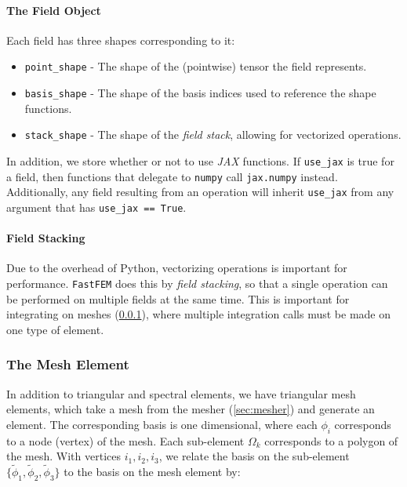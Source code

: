 \paragraph{The Field Object}

Each field has three shapes corresponding to it:
\begin{itemize}
\item \verb+point_shape+ - The shape of the (pointwise) tensor the field represents.
\item \verb+basis_shape+ - The shape of the basis indices used to reference the shape functions.
\item \verb+stack_shape+ - The shape of the \emph{field stack}, allowing for vectorized operations.
\end{itemize}

In addition, we store whether or not to use \emph{JAX} functions. If \verb+use_jax+ is true for a field, then functions that delegate to \verb+numpy+ call \verb+jax.numpy+ instead. Additionally, any field resulting from an operation will inherit \verb+use_jax+ from any argument that has \verb+use_jax == True+.

\paragraph{Field Stacking}

Due to the overhead of Python, vectorizing operations is important for performance. \texttt{FastFEM} does this by \emph{field stacking}, so that a single operation can be performed on multiple fields at the same time. This is important for integrating on meshes (\ref{sec:elem_field:mesh_element}), where multiple integration calls must be made on one type of element.

\subsubsection{The Mesh Element} \label{sec:elem_field:mesh_element}

In addition to triangular and spectral elements, we have triangular mesh elements, which take a mesh from the mesher (\ref{sec:mesher}) and generate an element. The corresponding basis is one dimensional, where each $\phi_i$ corresponds to a node (vertex) of the mesh. Each sub-element $\Omega_k$ corresponds to a polygon of the mesh. With vertices $i_1,i_2,i_3$, we relate the basis on the sub-element $\{\tilde\phi_1,\tilde\phi_2,\tilde\phi_3\}$ to the basis on the mesh element by:

